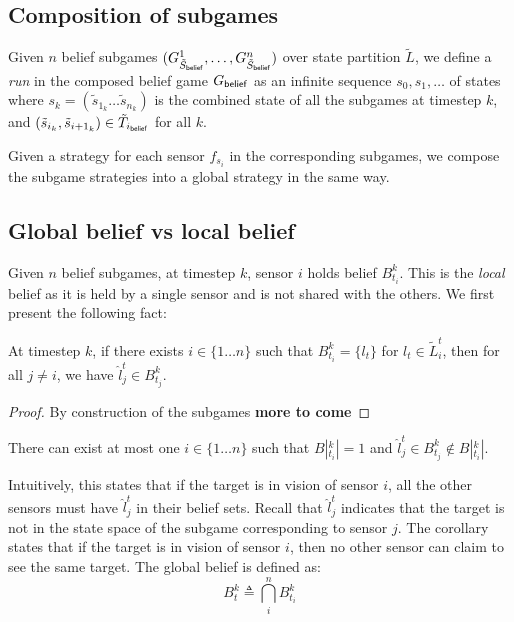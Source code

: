 \subsection{Composition of subgames}
Given $n$ belief subgames $(G^{1}_{\tilde{S}_{\mathsf{belief}}},\ldots,G^{n}_{\tilde{S}_{\mathsf{belief}}})$ over state partition $\widetilde{L}$, we define a \emph{run} in the composed belief game $G_{\mathsf{belief}}$ as an infinite sequence $s_0,s_1,\ldots$ of states where $s_k = (\tilde{s}_{1_k} \ldots \tilde{s}_{n_k})$ is the combined state of all the subgames at timestep $k$, and  $(\tilde{s}_{i_k},\tilde{s}_{{i+1}_k}) \in \tilde{T}_{i_{\mathsf{belief}}}$ for all $k$. 

Given a strategy for each sensor $f_{s_i}$ in the corresponding subgames, we compose the subgame strategies into a global strategy in the same way. 


\subsection{Global belief vs local belief}

Given $n$ belief subgames, at timestep $k$, sensor $i$ holds belief $B^k_{t_i}$. This is the \emph{local} belief as it is held by a single sensor and is not shared with the others. We first present the following fact: 
\begin{theorem} 
At timestep $k$, if there exists $i\in \{1\dots n\}$ such that $B^k_{t_i} = \{l_t\}$ for $l_t \in \widetilde{L}_i^t$, then for all $j \neq i$, we have $\hat{l}^t_j \in B^k_{t_j}$.
\end{theorem}
\begin{proof}
By construction of the subgames \textbf{more to come}
\end{proof}
\begin{corollary}\label{corr:uniqi}
There can exist at most one $i\in \{1\dots n\}$ such that $B|^k_{t_i}| = 1$ and $\hat{l}^t_j \in B^k_{t_j} \notin B|^k_{t_i}|$.
\end{corollary}
Intuitively, this states that if the target is in vision of sensor $i$, all the other sensors must have $\hat{l}^t_j$ in their belief sets. Recall that $\hat{l}^t_j$ indicates that the target is not in the state space of the subgame corresponding to sensor $j$. The corollary states that if the target is in vision of sensor $i$, then no other sensor can claim to see the same target. 
The global belief is defined as:
\[B^k_t \triangleq 
\bigcap_{i}^n B^k_{t_i}
\]

